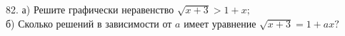 82. а) Решите графически неравенство $\sqrt{x+3}>1+x;$\\
б) Сколько решений в зависимости от  $a$ имеет уравнение $\sqrt{x+3}=1+ax?$\\
